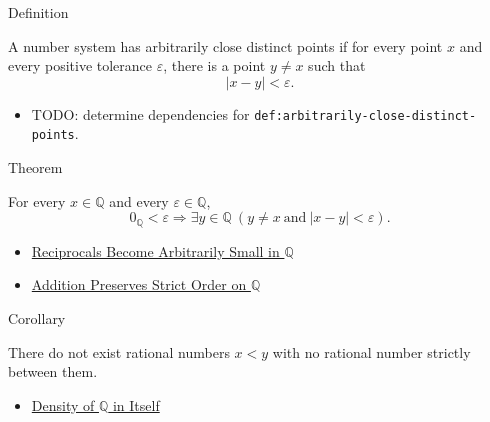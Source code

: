 \begin{definitionbox}{Definition}
\begin{definition}
\label{def:arbitrarily-close-distinct-points}
A number system has arbitrarily close distinct points if for every point $x$
and every positive tolerance $\varepsilon$, there is a point $y\ne x$ such that
\[
|x-y|<\varepsilon.
\]
\end{definition}
\end{definitionbox}

\begin{dependencies}
\begin{itemize}
  \item TODO: determine dependencies for \texttt{def:arbitrarily-close-distinct-points}.
\end{itemize}
\end{dependencies}

\begin{theorembox}{Theorem}
\begin{theorem}
\label{thm:q-has-arbitrarily-close-distinct-points}
For every $x\in\mathbb{Q}$ and every $\varepsilon\in\mathbb{Q}$,
\[
0_{\mathbb{Q}}<\varepsilon
\Longrightarrow
\exists y\in\mathbb{Q}\ (y\ne x\ \text{and}\ |x-y|<\varepsilon).
\]
\end{theorem}
\end{theorembox}

\begin{dependencies}
\begin{itemize}
  \item \hyperref[cor:reciprocals-arbitrarily-small-q]{Reciprocals Become Arbitrarily Small in $\mathbb{Q}$}
  \item \hyperref[thm:addition-preserves-strict-order-on-q]{Addition Preserves Strict Order on $\mathbb{Q}$}
\end{itemize}
\end{dependencies}

\begin{corollarybox}{Corollary}
\begin{corollary}
\label{cor:q-has-no-adjacent-points}
There do not exist rational numbers $x<y$ with no rational number strictly
between them.
\end{corollary}
\end{corollarybox}

\begin{dependencies}
\begin{itemize}
  \item \hyperref[thm:density-of-q]{Density of $\mathbb{Q}$ in Itself}
\end{itemize}
\end{dependencies}

